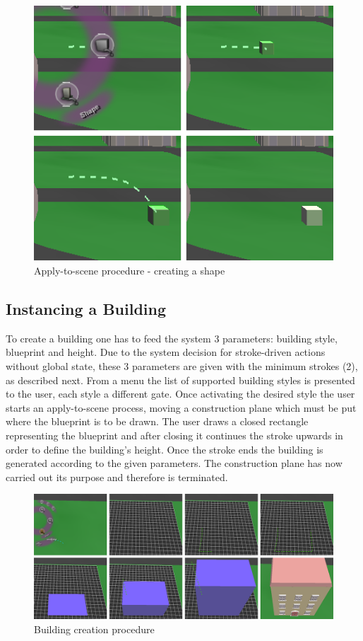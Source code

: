 \begin{figure}[ht]
	\centering
		\includegraphics[scale=0.5]{gfx/apply-to-scene.png}
	\caption{Apply-to-scene procedure - creating a shape}
	\label{fig:apply-to-scene}
\end{figure}



\subsection{Instancing a Building}
\label{design:building}

To create a building one has to feed the system 3 parameters: building style, blueprint and height.
Due to the system decision for stroke-driven actions without global state, these 3 parameters are given with the
minimum strokes (2), as described next.
From a menu the list of supported building styles is presented to the user, each style a different gate.
Once activating the desired style the user starts an apply-to-scene process, moving a construction plane which must
be put where the blueprint is to be drawn.
The user draws a closed rectangle representing the blueprint and after closing it continues
the stroke upwards in order to define the building's height.
Once the stroke ends the building is generated according to the given parameters.
The construction plane has now carried out its purpose and therefore is terminated.

\begin{figure}[ht]
	\centering
		\includegraphics[scale=0.4]{gfx/building.png}
	\caption{Building creation procedure}
	\label{fig:building}
\end{figure}
